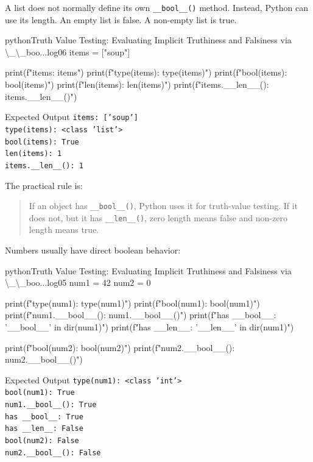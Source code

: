 \documentclass[a4paper,twoside]{report}
\begin{document}
A list does not normally define its own \texttt{\_\_bool\_\_()} method. Instead, Python can use its length. An empty list is false. A non-empty list is true.

\begin{codebox}[]{python}{Truth Value Testing: Evaluating Implicit Truthiness and Falsiness via \textbackslash{}\_\textbackslash{}\_boo...}{log06}
items = ["soup"]

print(f"items: {items}")
print(f"type(items): {type(items)}")
print(f"bool(items): {bool(items)}")
print(f"len(items): {len(items)}")
print(f"items.__len__(): {items.__len__()}")
\end{codebox}


\begin{iobox}{Expected Output}
\texttt{items: ['soup']} \\
\texttt{type(items): <class 'list'>} \\
\texttt{bool(items): True} \\
\texttt{len(items): 1} \\
\texttt{items.\_\_len\_\_(): 1} \\
\end{iobox}


The practical rule is:

\begin{quote}
If an object has \texttt{\_\_bool\_\_()}, Python uses it for truth-value testing. If it does not, but it has \texttt{\_\_len\_\_()}, zero length means false and non-zero length means true.
\end{quote}

Numbers usually have direct boolean behavior:

\begin{codebox}[]{python}{Truth Value Testing: Evaluating Implicit Truthiness and Falsiness via \textbackslash{}\_\textbackslash{}\_boo...}{log05}
num1 = 42
num2 = 0

print(f"type(num1): {type(num1)}")
print(f"bool(num1): {bool(num1)}")
print(f"num1.__bool__(): {num1.__bool__()}")
print(f"has __bool__: {'__bool__' in dir(num1)}")
print(f"has __len__: {'__len__' in dir(num1)}")

print(f"bool(num2): {bool(num2)}")
print(f"num2.__bool__(): {num2.__bool__()}")
\end{codebox}


\begin{iobox}{Expected Output}
\texttt{type(num1): <class 'int'>} \\
\texttt{bool(num1): True} \\
\texttt{num1.\_\_bool\_\_(): True} \\
\texttt{has \_\_bool\_\_: True} \\
\texttt{has \_\_len\_\_: False} \\
\texttt{bool(num2): False} \\
\texttt{num2.\_\_bool\_\_(): False} \\
\end{iobox}
\end{document}

